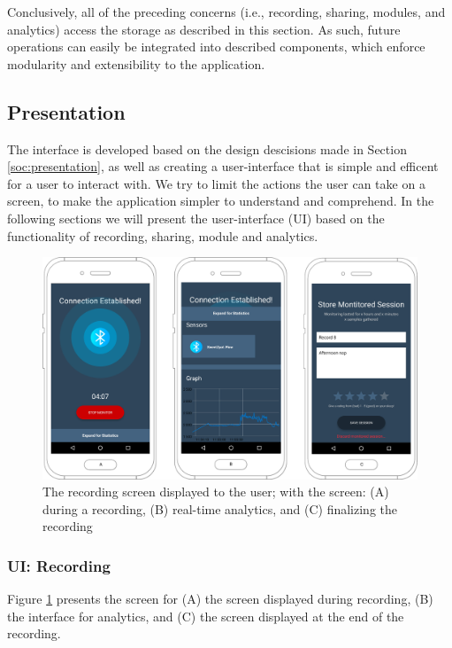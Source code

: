 Conclusively, all of the preceding concerns (i.e., recording, sharing, modules, and analytics) access the storage as described in this section. As such, future operations can easily be integrated into described components, which enforce modularity and extensibility to the application.

\subsection{Presentation}\label{ioc:presentation}
The interface is developed based on the design descisions made in Section \ref{soc:presentation}, as well as creating a user-interface that is simple and efficent for a user to interact with. We try to limit the actions the user can take on a screen, to make the application simpler to understand and comprehend. In the following sections we will present the user-interface (UI) based on the functionality of recording, sharing, module and analytics. 

\begin{figure}[!h]
    \centering
    \includegraphics[scale=0.26]{images/Recording_img.pdf}
    \caption{The recording screen displayed to the user; with the screen: (A) during a recording, (B) real-time analytics, and (C) finalizing the recording}
    \label{fig:screen_recording}
\end{figure}

\subsubsection{UI: Recording}

Figure \ref{fig:screen_recording} presents the screen for (A) the screen displayed during recording, (B) the interface for analytics, and (C) the screen displayed at the end of the recording. 

